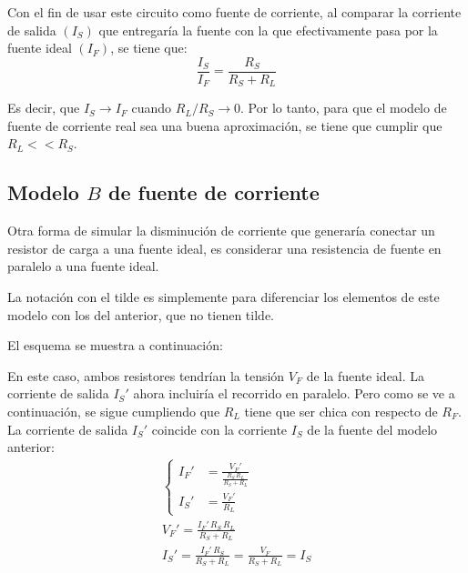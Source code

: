 \documentclass[a5paper,12pt,twoside]{book}
\begin{document}
Con el fin de usar este circuito como fuente de corriente, al comparar la corriente de salida $(I_S)$ que entregaría la fuente con la que efectivamente pasa por la fuente ideal $(I_F)$, se tiene que:
\begin{equation*}
    \frac{I_S}{I_F} = \frac{R_S}{R_S + R_L}
\end{equation*}

Es decir, que $I_S \to I_F$ cuando $R_L/R_S \to 0$. Por lo tanto, para que el modelo de fuente de corriente real sea una buena aproximación, se tiene que cumplir que $R_L<<R_S$.

\begin{center}
    \def\svgwidth{0.6\linewidth}
    
\end{center}


\subsection{Modelo $B$ de fuente de corriente}

Otra forma de simular la disminución de corriente que generaría conectar un resistor de carga a una fuente ideal, es considerar una resistencia de fuente en paralelo a una fuente ideal.

La notación con el tilde es simplemente para diferenciar los elementos de este modelo con los del anterior, que no tienen tilde.

El esquema se muestra a continuación:

\begin{multicols}{2}
    \begin{center}
        \def\svgwidth{0.9\linewidth}
        
    \end{center}
    \begin{center}
        \def\svgwidth{0.9\linewidth}
        
    \end{center}
\end{multicols}

En este caso, ambos resistores tendrían la tensión $V_F$ de la fuente ideal.
La corriente de salida $I_S'$ ahora incluiría el recorrido en paralelo.
Pero como se ve a continuación, se sigue cumpliendo que $R_L$ tiene que ser chica con respecto de $R_F$.
La corriente de salida $I_S'$ coincide con la corriente $I_S$ de la fuente del modelo anterior:
\begin{gather*}
    \left\{
    \begin{aligned}
        I_F' &= \frac{V_F'}{\frac{R_S \, R_L}{R_S + R_L}}
        \\[1ex]
        I_S' &= \frac{V_F'}{R_L}
    \end{aligned}
    \right.
    \\[1em]
    V_F' = \frac{I_F' \, R_S \, R_L}{R_S + R_L}
    \\[1em]
    I_S' = \frac{I_F' \, R_S}{R_S + R_L} = \frac{V_F}{R_S + R_L} = I_S
\end{gather*}
\end{document}
